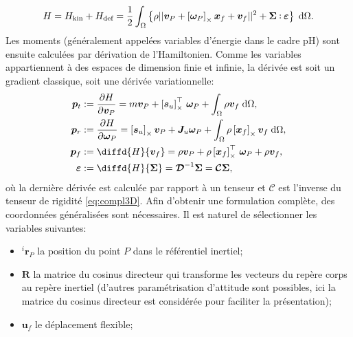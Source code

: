 \begin{equation*}
H = H_{\text{kin}} + H_{\text{def}}= \frac{1}{2} \int_{\Omega} \left\{\rho ||\bm{v}_P + \crmat{\bm{\omega}_P} \bm{x}_f + {\bm{v}}_f||^2 + \bm\Sigma \cddot \bm\varepsilon \right\}  \d{\Omega}.
\end{equation*}
Les moments (généralement appelées variables d'énergie dans le cadre pH) sont ensuite calculées par dérivation de l'Hamiltonien. Comme les variables appartiennent à des espaces de dimension finie et infinie, la dérivée est soit un gradient classique, soit une dérivée variationnelle:
\begin{equation*}
\begin{aligned}
\bm{p}_t &:= \diffp{H}{\bm{v}_P} = m \bm{v}_P + \crmat{\bm{s}_u}^\top \, \bm\omega_P + \int_{\Omega} \rho \bm{v}_f \d{\Omega}, \\
\bm{p}_r &:= \diffp{H}{\bm\omega_P} = \crmat{\bm{s}_u} \bm{v}_P + \bm{J}_u \bm\omega_P + \int_{\Omega} \rho \crmat{\bm{x}_f} \bm{v}_f \d{\Omega}, \\
\bm{p}_f &:= \diffd{H}{\bm{v}_f} = \rho \bm{v}_P + \rho \crmat{\bm{x}_f}^\top \, \bm\omega_P + \rho \bm{v}_f, \\
\bm\varepsilon &:= \diffd{H}{\bm\Sigma} = \bm{\mathcal{D}}^{-1} \bm\Sigma= \bm{\mathcal{C}} \bm\Sigma,
\end{aligned}
\end{equation*}
où la dernière dérivée est calculée par rapport à un tenseur et $\bm{\mathcal{C}} $ est l'inverse du tenseur de rigidité \eqref{eq:compl3D}. Afin d'obtenir une formulation complète, des coordonnées généralisées sont nécessaires. Il est naturel de sélectionner les variables suivantes:
\begin{itemize}
\item $^i \bm{r}_P$ la position du point $P$ dans le référentiel inertiel;
\item $\bm{R}$ la matrice du cosinus directeur qui transforme les vecteurs du repère corps au repère inertiel (d'autres paramétrisation d'attitude sont possibles, ici la matrice du cosinus directeur est considérée pour faciliter la présentation);
\item $\bm{u}_f$ le déplacement flexible;
\end{itemize}


